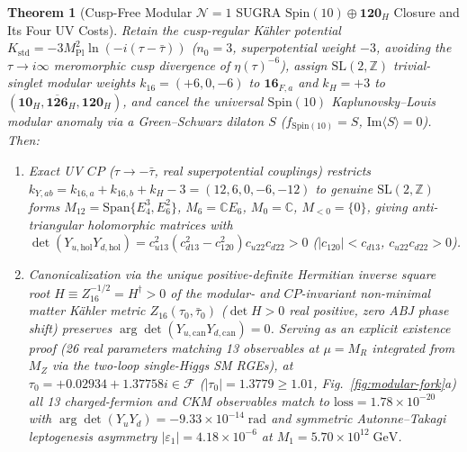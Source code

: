 \documentclass[11pt,a4paper]{article}
\newtheorem{theorem}{Theorem}[section]
\begin{document}
\begin{theorem}[Cusp-Free Modular $\mathcal{N}=1$ SUGRA $\mathrm{Spin}(10)\oplus\mathbf{120}_H$ Closure and Its Four UV Costs]
\label{thm:modular}
Retain the cusp-regular K\"ahler potential $K_{\mathrm{std}} = -3 M_{\mathrm{Pl}}^2\ln(-i(\tau-\bar{\tau}))$ ($n_0 = 3$, superpotential weight $-3$, avoiding the $\tau \to i\infty$ meromorphic cusp divergence of $\eta(\tau)^{-6}$), assign $\mathrm{SL}(2,\mathbb{Z})$ trivial-singlet modular weights $k_{16} = (+6, 0, -6)$ to $\mathbf{16}_{F,a}$ and $k_H = +3$ to $(\mathbf{10}_H, \overline{\mathbf{126}}_H, \mathbf{120}_H)$, and cancel the universal $\mathrm{Spin}(10)$ Kaplunovsky--Louis modular anomaly via a Green--Schwarz dilaton $S$ ($f_{\mathrm{Spin}(10)} = S$, $\mathrm{Im}\langle S\rangle = 0$). Then:
\begin{enumerate}[label=(\arabic*),leftmargin=1.8em,itemsep=2pt]
\item Exact UV $CP$ ($\tau \to -\bar{\tau}$, real superpotential couplings) restricts $k_{Y,ab} = k_{16,a}+k_{16,b}+k_H-3 = (12,6,0,-6,-12)$ to genuine $\mathrm{SL}(2,\mathbb{Z})$ forms $M_{12} = \mathrm{Span}\{E_4^3, E_6^2\}$, $M_6 = \mathbb{C} E_6$, $M_0 = \mathbb{C}$, $M_{<0}=\{0\}$, giving anti-triangular holomorphic matrices with $\det(Y_{u,\mathrm{hol}}Y_{d,\mathrm{hol}}) = c_{u13}^2(c_{d13}^2 - c_{120}^2)c_{u22}c_{d22} > 0$ ($|c_{120}| < c_{d13}$, $c_{u22}c_{d22} > 0$).
\item Canonicalization via the unique positive-definite Hermitian inverse square root $H \equiv Z_{16}^{-1/2} = H^\dagger > 0$ of the modular- and $CP$-invariant non-minimal matter K\"ahler metric $Z_{16}(\tau_0,\bar{\tau}_0)$ \cite{ChenRamosSanchezRatz2020} ($\det H > 0$ real positive, zero ABJ phase shift) preserves $\arg\det(Y_{u,\mathrm{can}}Y_{d,\mathrm{can}}) = 0$. Serving as an explicit existence proof (26 real parameters matching 13 observables at $\mu = M_R$ integrated from $M_Z$ via the two-loop single-Higgs SM RGEs), at $\tau_0 = +0.02934 + 1.37758i \in \mathcal{F}$ ($|\tau_0| = 1.3779 \ge 1.01$, Fig.~\ref{fig:modular-fork}a) all 13 charged-fermion and CKM observables match to $\mathrm{loss} = 1.78\times 10^{-20}$ with $\arg\det(Y_u Y_d) = -9.33\times 10^{-14}\;\mathrm{rad}$ and symmetric Autonne--Takagi leptogenesis asymmetry $|\varepsilon_1| = 4.18\times 10^{-6}$ at $M_1 = 5.70\times 10^{12}\;\mathrm{GeV}$.

\end{enumerate}
\end{theorem}
\end{document}
